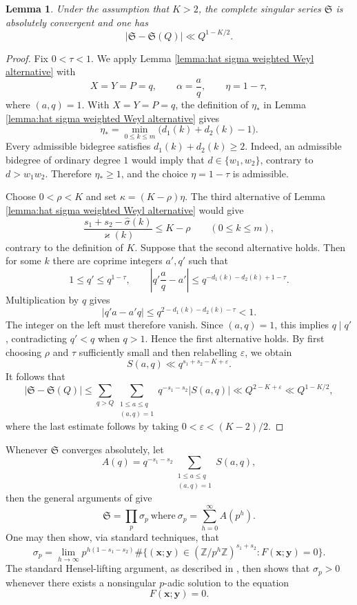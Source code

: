 \documentclass[12pt,reqno]{amsart}
\newtheorem{lemma}[theorem]{Lemma}
\theoremstyle{definition}
\theoremstyle{remark}
\numberwithin{equation}{section}
\def\bfx{{\mathbf x}}
\def\bfy{{\mathbf y}}
\def\Z{{\mathbb Z}}\def\Q{{\mathbb Q}}
\def\grS{{\mathfrak S}}\def\grP{{\mathfrak P}}
\def\a{{\alpha}} \def\bfalp{{\boldsymbol \alpha}} \def\atil{{\widetilde \alpha}}
\def\eps{\varepsilon}
\def\le{\leqslant} \def\ge{\geqslant} \def\pleq{\preccurlyeq} \def\ple{\prec}
\begin{document}
\begin{lemma}\label{lemma: complete singular series}
    Under the assumption that $K > 2$, the complete singular series $\grS$ is absolutely convergent and one has
    \[|\grS - \grS(Q)| \ll Q^{1-K/2}.\]
\end{lemma}
\begin{proof}
    Fix $0<\tau<1$.  We apply Lemma
    \ref{lemma:hat sigma weighted Weyl alternative} with
    \[
        X=Y=P=q,
        \qquad
        \a=\frac aq,
        \qquad
        \eta=1-\tau,
    \]
    where $(a,q)=1$.  With $X=Y=P=q$, the definition of $\eta_*$ in
    Lemma \ref{lemma:hat sigma weighted Weyl alternative} gives
    \[
        \eta_*
        =\min_{0\leq k\leq m}
        \bigl(d_1(k)+d_2(k)-1\bigr).
    \]
    Every admissible bidegree satisfies $d_1(k)+d_2(k)\geq2$.  Indeed,
    an admissible bidegree of ordinary degree $1$ would imply that
    $d\in\{w_1,w_2\}$, contrary to $d>w_1w_2$.  Therefore
    $\eta_*\geq1$, and the choice $\eta=1-\tau$ is admissible.

    Choose $0<\rho<K$ and set $\kappa=(K-\rho)\eta$.  The third
    alternative of Lemma \ref{lemma:hat sigma weighted Weyl alternative} would give
    \[
        \frac{s_1+s_2-\widehat{\sigma}(k)}{\varkappa(k)}\leq K-\rho
        \qquad
        \left(0\leq k\leq m\right),
    \]
    contrary to the definition of $K$.  Suppose that the second
    alternative holds.  Then for some $k$ there are coprime integers
    $a',q'$ such that
    \[
        1\leq q'\leq q^{1-\tau},
        \qquad
        \left|q'\frac aq-a'\right|
        \leq q^{-d_1(k)-d_2(k)+1-\tau}.
    \]
    Multiplication by $q$ gives
    \[
        |q'a-a'q|
        \leq q^{2-d_1(k)-d_2(k)-\tau}<1.
    \]
    The integer on the left must therefore vanish.  Since $(a,q)=1$,
    this implies $q\mid q'$, contradicting $q'<q$ when $q>1$.
    Hence the first alternative holds.  By first choosing $\rho$ and
    $\tau$ sufficiently small and then relabelling $\eps$, we obtain
    \[
        S(a,q)\ll q^{s_1+s_2-K+\eps}.
    \]
    It follows that
    \[
        |\grS-\grS(Q)|
        \leq
        \sum_{q>Q}\sum_{\substack{1\leq a\leq q\\(a,q)=1}}
        q^{-s_1-s_2}|S(a,q)|
        \ll Q^{2-K+\eps}
        \ll Q^{1-K/2},
    \]
    where the last estimate follows by taking
    $0<\eps<(K-2)/2$.
\end{proof}

Whenever $\grS$ converges absolutely, let
\[A(q) = q^{-s_1-s_2}\sum_{\substack{1 \le a \le q \\ (a,q) = 1}}S(a,q),\]
then the general arguments of \cite[Section 17]{Davenport2005} give
\[\grS = \prod_{p}\sigma_p \ \text{where} \    \sigma_p = \sum_{h=0}^{\infty}A(p^h).\]
One may then show, via standard techniques, that
\[\sigma_p = \lim_{h \to \infty}p^{h(1-s_1-s_2)} \# \{(\bfx;\bfy) \in (\Z/p^h\Z)^{s_1+s_2}: F(\bfx;\bfy) = 0 \}.\]
The standard Hensel-lifting argument, as described in
\cite[Section 17]{Davenport2005}, then shows that $\sigma_p>0$ whenever
there exists a nonsingular $p$-adic solution to the equation
\[F(\bfx;\bfy) = 0.\]
\end{document}
